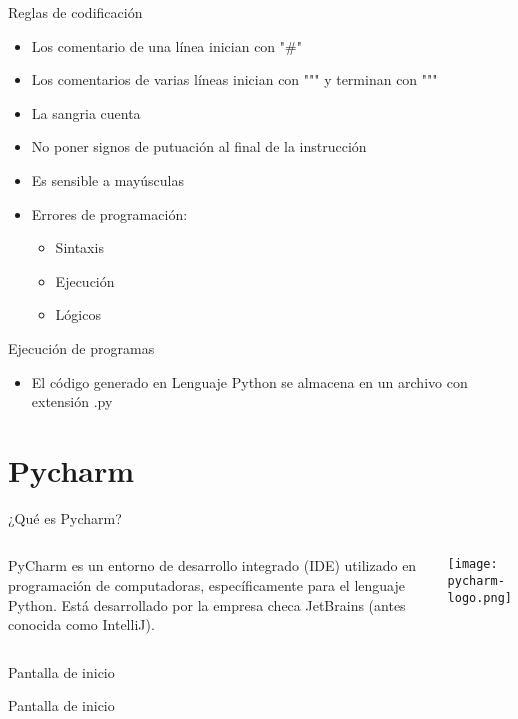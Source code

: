 \begin{frame}[c]{Reglas de codificación}
  \begin{itemize}
    \item Los comentario de una línea inician con "\#"
    \item Los comentarios de varias líneas inician con """ y terminan con """
    \item La sangria cuenta
    \item No poner signos de putuación al final de la instrucción
    \item Es sensible a mayúsculas
    \item Errores de programación:
          \begin{itemize}
            \item Sintaxis
            \item Ejecución
            \item Lógicos
          \end{itemize}
  \end{itemize}
\end{frame}

\begin{frame}[c]{Ejecución de programas}
  \begin{itemize}
    \item El código generado en Lenguaje Python se almacena en un archivo con
      extensión .py
  \end{itemize}
\end{frame}

\section{Pycharm}

\begin{frame}[c]{¿Qué es Pycharm?}
    \begin{columns}
        PyCharm es un entorno de desarrollo integrado (IDE) utilizado en
        programación de computadoras, específicamente para el lenguaje Python.
        Está desarrollado por la empresa checa JetBrains (antes conocida como
        IntelliJ).
        \begin{center}
            \texttt{[image: pycharm-logo.png]}
        \end{center}
    \end{columns}
\end{frame}

\begin{frame}[c]{Pantalla de inicio}
    \begin{center}
        Pantalla de inicio
    \end{center}
\end{frame}
